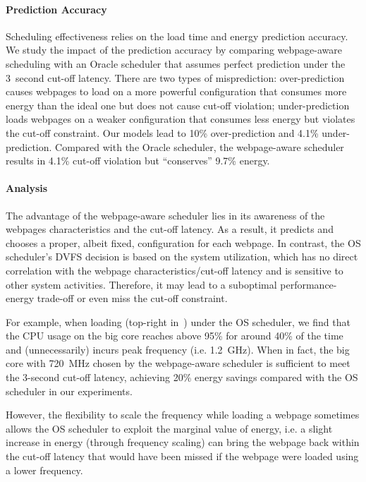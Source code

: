\paragraph{Prediction Accuracy} Scheduling effectiveness relies on the load time and energy prediction accuracy. We study the impact of the prediction accuracy by comparing webpage-aware scheduling with an Oracle scheduler that assumes perfect prediction under the 3~second cut-off latency. There are two types of misprediction: over-prediction causes webpages to load on a more powerful configuration that consumes more energy than the ideal one but does not cause cut-off violation; under-prediction loads webpages on a weaker configuration that consumes less energy but violates the cut-off constraint.  Our models lead to 10\% over-prediction and 4.1\% under-prediction. Compared with the Oracle scheduler, the webpage-aware scheduler results in 4.1\% cut-off violation but ``conserves'' 9.7\% energy.

\paragraph{Analysis} The advantage of the webpage-aware scheduler lies in its awareness of the webpages characteristics and the cut-off latency. As a result, it predicts and chooses a proper, albeit fixed, configuration for each webpage. In contrast, the OS scheduler's DVFS decision is based on the system utilization, which has no direct correlation with the webpage characteristics/cut-off latency and is sensitive to other system activities. Therefore, it may lead to a suboptimal performance-energy trade-off or even miss the cut-off constraint.

For example, when loading  (top-right in~) under the OS scheduler, we find that the CPU usage on the big core reaches above 95\% for around 40\% of the time and (unnecessarily) incurs peak frequency (i.e. 1.2~GHz).  When in fact, the big core with 720~MHz chosen by the webpage-aware scheduler is sufficient  to meet the 3-second cut-off latency, achieving 20\% energy savings compared with the OS scheduler in our experiments.

However, the flexibility to scale the frequency while loading a webpage sometimes allows the OS scheduler to exploit the marginal value of energy, i.e. a slight increase in energy (through frequency scaling) can bring the webpage back within the cut-off latency that would have been missed if the webpage were loaded using a lower frequency.

